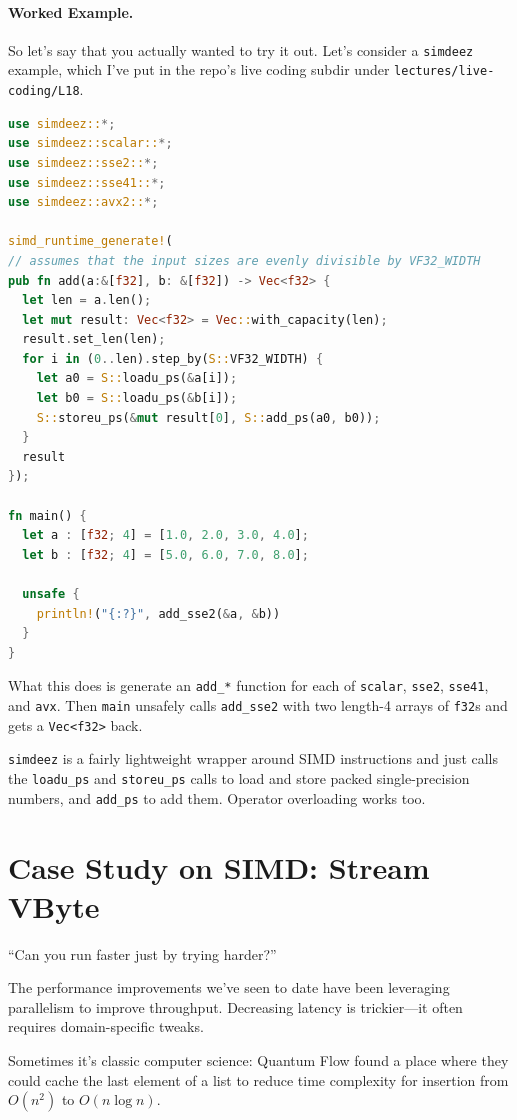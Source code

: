 \documentclass[a4paper]{report}
\begin{document}
\paragraph{Worked Example.} So let's say that you actually wanted to try it out. Let's consider a \texttt{simdeez} example, which I've put in the repo's live coding subdir under \texttt{lectures/live-coding/L18}.

\begin{lstlisting}[language=Rust]
use simdeez::*;
use simdeez::scalar::*;
use simdeez::sse2::*;
use simdeez::sse41::*;
use simdeez::avx2::*;

simd_runtime_generate!(
// assumes that the input sizes are evenly divisible by VF32_WIDTH
pub fn add(a:&[f32], b: &[f32]) -> Vec<f32> {
  let len = a.len();
  let mut result: Vec<f32> = Vec::with_capacity(len);
  result.set_len(len);
  for i in (0..len).step_by(S::VF32_WIDTH) {
    let a0 = S::loadu_ps(&a[i]);
    let b0 = S::loadu_ps(&b[i]);
    S::storeu_ps(&mut result[0], S::add_ps(a0, b0));
  }
  result
});

fn main() {
  let a : [f32; 4] = [1.0, 2.0, 3.0, 4.0];
  let b : [f32; 4] = [5.0, 6.0, 7.0, 8.0];

  unsafe {
    println!("{:?}", add_sse2(&a, &b))
  }
}
\end{lstlisting}
What this does is generate an \texttt{add\_*} function for each of \texttt{scalar},
\texttt{sse2}, \texttt{sse41}, and \texttt{avx}. Then \texttt{main}
unsafely calls \texttt{add\_sse2} with two length-4 arrays of \texttt{f32}s and
gets a \texttt{Vec<f32>} back.

\texttt{simdeez} is a fairly lightweight wrapper around SIMD instructions and just
calls the \texttt{loadu\_ps} and \texttt{storeu\_ps} calls to load and store
packed single-precision numbers, and \texttt{add\_ps} to add them. Operator overloading
works too.

\section*{Case Study on SIMD: Stream VByte }

\hfill ``Can you run faster just by trying harder?''

The performance improvements we've seen to date have been leveraging parallelism
to improve throughput. Decreasing latency is trickier---it often requires domain-specific
tweaks.

Sometimes it's classic computer science: Quantum Flow found a place
where they could cache the last element of a list to reduce time
complexity for insertion from $O(n^2)$ to $O(n \log n)$.
\end{document}

